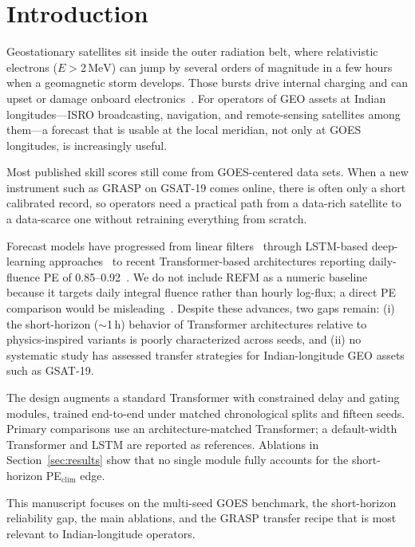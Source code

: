 \documentclass[conference]{IEEEtran}
\begin{document}
\section{Introduction}
Geostationary satellites sit inside the outer radiation belt, where
relativistic electrons (\(E>2\,\mathrm{MeV}\)) can jump by several orders of
magnitude in a few hours when a geomagnetic storm develops. Those bursts drive
internal charging and can upset or damage onboard electronics~\cite{b1,b2}.
For operators of GEO assets at Indian longitudes---ISRO broadcasting,
navigation, and remote-sensing satellites among them---a forecast that is
usable at the local meridian, not only at GOES longitudes, is increasingly
useful.

Most published skill scores still come from GOES-centered data sets. When a
new instrument such as GRASP on GSAT-19 comes online, there is often only a
short calibrated record, so operators need a practical path from a data-rich
satellite to a data-scarce one without retraining everything from scratch.

Forecast models have progressed from linear filters~\cite{b3,b4}
through LSTM-based deep-learning approaches~\cite{b5,b6,b7}
to recent Transformer-based architectures reporting daily-fluence PE of
0.85--0.92~\cite{b8,b9,b10}. We do not include REFM as a numeric baseline because it targets daily integral
fluence rather than hourly log-flux; a direct PE comparison would be
misleading~\cite{b4}. Despite these advances,
two gaps remain: (i) the short-horizon (\(\sim\)1\,h) behavior of
Transformer architectures relative to physics-inspired variants is poorly
characterized across seeds, and (ii) no systematic study has assessed
transfer strategies for Indian-longitude GEO assets such as GSAT-19.

The design augments a standard Transformer with constrained delay and
gating modules, trained end-to-end under matched chronological splits
and fifteen seeds. Primary comparisons use an architecture-matched
Transformer; a default-width Transformer and LSTM are reported as
references. Ablations in Section~\ref{sec:results} show that no single
module fully accounts for the short-horizon PE$_{\mathrm{clim}}$ edge.

This manuscript focuses on the multi-seed GOES benchmark, the
short-horizon reliability gap, the main ablations, and the GRASP transfer
recipe that is most relevant to Indian-longitude operators.
\end{document}
